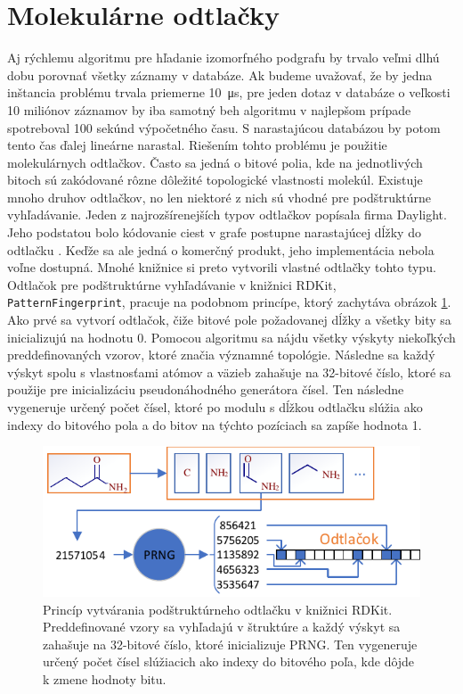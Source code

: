 \documentclass[slovak]{ExcelAtFIT} %
\begin{document}
\section{Molekulárne odtlačky}
Aj rýchlemu algoritmu pre hľadanie izomorfného podgrafu by trvalo veľmi dlhú dobu porovnať všetky zá\-zna\-my v databáze. Ak budeme uvažovať, že by jedna inštancia problému trvala priemerne \SI{10}{\micro\second}, pre jeden dotaz v databáze o veľkosti 10 miliónov záznamov by iba samotný beh algoritmu v najlepšom prípade spotreboval 100 sekúnd výpočetného času. S narastajúcou databázou by potom tento čas ďalej lineárne narastal. Riešením tohto problému je použitie molekulárnych odtlačkov. Často sa jedná o bitové polia, kde na jednotlivých bitoch sú zakódované rôzne dôležité topologické vlastnosti molekúl. Existuje mnoho druhov odtlačkov, no len niektoré z nich sú vhodné pre pod\-štruk\-túrne vyhľadávanie. Jeden z najrozšírenejších typov odtlačkov popísala firma Daylight. Jeho podstatou bolo kódovanie ciest v grafe postupne narastajúcej dĺžky do odtlačku \cite{daylight_fp}. Keďže sa ale jedná o komerčný produkt, jeho implementácia nebola voľne dostupná. Mnohé knižnice si preto vytvorili vlastné odtlačky tohto typu. Odtlačok pre podštruktúrne vyhľadávanie v knižnici RDKit, \texttt{PatternFingerprint}, pracuje na podobnom prin\-cípe, ktorý zachytáva obrázok \ref{fig:fp}. Ako prvé sa vytvorí odtlačok, čiže bitové pole požadovanej dĺžky a všetky bity sa inicializujú na hodnotu 0. Pomocou algoritmu sa nájdu všetky výskyty niekoľkých preddefinovaných vzorov, ktoré značia významné topológie. Následne sa každý výskyt spolu s vlastnosťami atómov a väzieb zahašuje na 32-bitové číslo, ktoré sa použije pre inicializáciu pseudonáhodného generátora čísel. Ten následne vygeneruje určený počet čísel, ktoré po modulu s dĺžkou odtlačku slúžia ako indexy do bitového pola a do bitov na týchto pozíciach sa zapíše hodnota 1.

\begin{figure}[!htb]
	\centering
	\includegraphics[width=1\linewidth]{images/daylight.pdf}
	\caption{Princíp vytvárania podštruktúrneho odtlačku v knižnici RDKit. Preddefinované vzory sa vyhľadajú v štruktúre a každý výskyt sa zahašuje na 32-bitové číslo, ktoré inicializuje PRNG. Ten vy\-ge\-ne\-ru\-je určený počet čísel slúžiacich ako indexy do bitového poľa, kde dôjde k zmene hodnoty bitu.}
	\label{fig:fp}
\end{figure}
\end{document}
